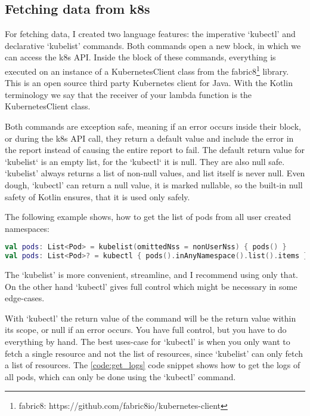 \subsection{Fetching data from k8s}

For fetching data, I created two language features: the imperative `kubectl' and declarative `kubelist' commands. Both commands open a new block, in which we can access the k8s API. Inside the block of these commands, everything is executed on an instance of a KubernetesClient class from the fabric8\footnote{fabric8: https://github.com/fabric8io/kubernetes-client} library. This is an open source third party Kubernetes client for Java. With the Kotlin terminology we say that the receiver of your lambda function is the KubernetesClient class.

Both commands are exception safe, meaning if an error occurs inside their block, or during the k8s API call, they return a default value and include the error in the report instead of causing the entire report to fail. The default return value for `kubelist` is an empty list, for the `kubectl` it is null. They are also null safe. `kubelist' always returns a list of non-null values, and list itself is never null. Even dough, `kubectl' can return a null value, it is marked nullable, so the built-in null safety of Kotlin ensures, that it is used only safely.

The following example shows, how to get the list of pods from all user created namespaces:

\begin{lstlisting}[caption={Usage of kubelist and kubectl},language=Kotlin,label=code:kubelist_usage]
val pods: List<Pod> = kubelist(omittedNss = nonUserNss) { pods() }
val pods: List<Pod>? = kubectl { pods().inAnyNamespace().list().items }?.filter { it.metadata.namespace !in nonUserNss }
\end{lstlisting}

The `kubelist' is more convenient, streamline, and I recommend using only that. On the other hand `kubectl' gives full control which might be necessary in some edge-cases.

With `kubectl' the return value of the command will be the return value within its scope, or null if an error occurs. You have full control, but you have to do everything by hand. The best uses-case for `kubectl' is when you only want to fetch a single resource and not the list of resources, since `kubelist' can only fetch a list of resources. The \ref{code:get_logs} code snippet shows how to get the logs of all pods, which can only be done using the `kubectl' command.

